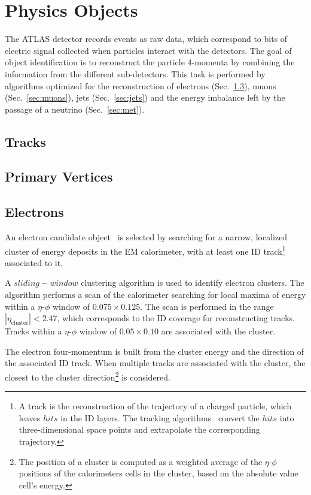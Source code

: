 \chapter{Physics Objects}
\label{sec:objects}

The ATLAS detector records events as raw data, 
which correspond to bits of electric signal collected 
when particles interact with the detectors. 
The goal of object identification is to reconstruct the particle 4-momenta
by combining the information from the different sub-detectors.
This task is performed by algorithms optimized for the reconstruction of
electrons (Sec.~\ref{sec:electrons}), muons (Sec.~\ref{sec:muons}), 
jets (Sec.~\ref{sec:jets}) and the energy imbalance left
by the passage of a neutrino (Sec.~\ref{sec:met}).

\section{Tracks}
\label{sec:tracks}

\section{Primary Vertices}
\label{sec:pv}

\section{Electrons}
\label{sec:electrons}

An electron candidate object~\cite{elereco} is selected by searching for a narrow, 
localized cluster of energy deposits in the EM calorimeter, 
with at least one ID track\footnote{A track is the reconstruction 
of the trajectory of a charged particle, which leaves $hits$ in the 
ID layers. The tracking algorithms~\cite{trackalgos} convert the 
$hits$ into three-dimensional space points and extrapolate the 
corresponding trajectory.}
associated to it.

A $sliding-window$ clustering algorithm is used to identify electron 
clusters. The algorithm performs a scan of the calorimeter searching 
for local maxima of energy
within a $\eta$-$\phi$ window of $0.075\times{}0.125$.
The scan is performed in the range $|\eta_{\mathrm{cluster}}|<2.47$, 
which corresponds to the ID coverage for reconstructing tracks. 
Tracks within a $\eta$-$\phi$ window of $0.05\times{}0.10$ are 
associated with the cluster.

The electron four-momentum is built from the cluster energy
and the direction of the associated ID track.
When multiple tracks are associated with the cluster, the closest
to the cluster direction\footnote{The position of a cluster 
is computed as a weighted average of the $\eta$-$\phi$ positions 
of the calorimeters cells in the cluster, based on the absolute 
value cell's energy.} is considered.                        

